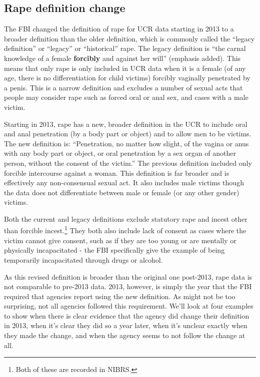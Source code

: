 \documentclass[
]{krantz}
\begin{document}
\subsection{Rape definition
change}\label{rape-definition-change}

The FBI changed the definition of rape for UCR data starting
in 2013 to a broader definition than the older definition,
which is commonly called the ``legacy definition'' or
``legacy'' or ``historical'' rape. The legacy definition is
``the carnal knowledge of a female \textbf{forcibly} and
against her will'' (emphasis added). This means that only
rape is only included in UCR data when it is a female (of
any age, there is no differentiation for child victims)
forcibly vaginally penetrated by a penis. This is a narrow
definition and excludes a number of sexual acts that people
may consider rape such as forced oral or anal sex, and cases
with a male victim.

Starting in 2013, rape has a new, broader definition in the
UCR to include oral and anal penetration (by a body part or
object) and to allow men to be victims. The new definition
is: ``Penetration, no matter how slight, of the vagina or
anus with any body part or object, or oral penetration by a
sex organ of another person, without the consent of the
victim.'' The previous definition included only forcible
intercourse against a woman. This definition is far broader
and is effectively any non-consensual sexual act. It also
includes male victims though the data does not differentiate
between male or female (or any other gender) victims.

Both the current and legacy definitions exclude statutory
rape and incest other than forcible incest.\footnote{Both of
  these are recorded in NIBRS.} They both also include lack
of consent as cases where the victim cannot give consent,
such as if they are too young or are mentally or physically
incapacitated - the FBI specifically give the example of
being temporarily incapacitated through drugs or alcohol.

As this revised definition is broader than the original one
post-2013, rape data is not comparable to pre-2013 data.
2013, however, is simply the year that the FBI required that
agencies report using the new definition. As might not be
too surprising, not all agencies followed this requirement.
We'll look at four examples to show when there is clear
evidence that the agency did change their definition in
2013, when it's clear they did so a year later, when it's
unclear exactly when they made the change, and when the
agency seems to not follow the change at all.
\end{document}
